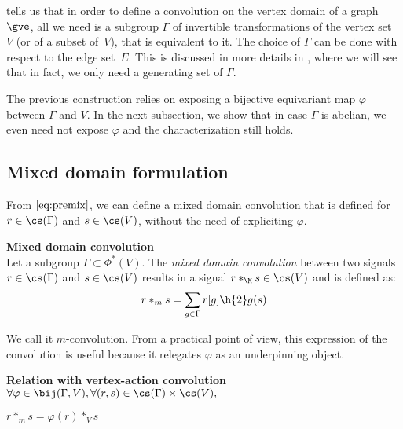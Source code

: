  tells us that in order to define a convolution on the vertex domain of a graph $\gve$, all we need is a subgroup $\Gamma$ of invertible transformations of the vertex set~$V$ (or of a subset of~$V$), that is equivalent to it. The choice of $\Gamma$ can be done with respect to the edge set~$E$. This is discussed in more details in , where we will see that in fact, we only need a generating set of $\Gamma$.

The previous construction relies on exposing a bijective equivariant map $\varphi$ between $\Gamma$ and $V$. In the next subsection, we show that in case $\Gamma$ is abelian, we even need not expose $\varphi$ and the characterization still holds.

\subsection{Mixed domain formulation}

From $\eqref{eq:premix}$, we can define a mixed domain convolution \ie that is defined for $r \in \cs(\Gamma)$ and $s \in \cs(V)$, without the need of expliciting $\varphi$.

\begin{definition}\textbf{Mixed domain convolution}\\
Let a subgroup $\Gamma \subset \Phi^*(V)$.
The \emph{mixed domain convolution} between two signals $r \in \cs(\Gamma)$ and $s \in \cs(V)$ results in a signal $r \ast_{\M} s \in \cs(V)$ and is defined as:
\begin{gather*}
r \ast_m s = \displaystyle \sum_{g \in \Gamma} r[g] \h{2} g(s)
\end{gather*}
\label{def:convm}
\end{definition}

We call it $m$-convolution. From a practical point of view, this expression of the convolution is useful because it relegates $\varphi$ as an underpinning object.%

\begin{lemma}\textbf{Relation with vertex-action convolution}\\
$\forall \varphi \in \bij(\Gamma, V), \forall (r,s) \in \cs(\Gamma) \times \cs(V),$\\
\centerline{$r \ast_m s = \varphi(r) \ast_{V} s$}
\label{lem:rel3m}
\end{lemma}

